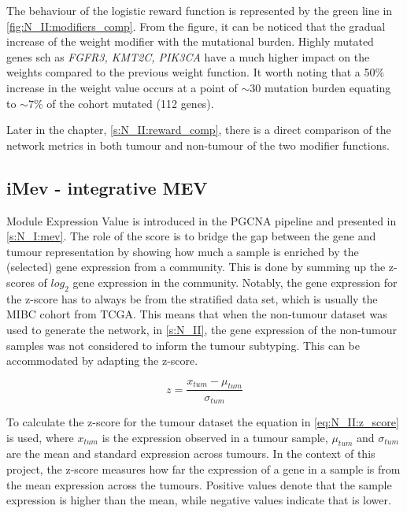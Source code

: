 The behaviour of the logistic reward function is represented by the green line in \cref{fig:N_II:modifiers_comp}. From the figure, it can be noticed that the gradual increase of the weight modifier with the mutational burden. Highly mutated genes sch as \textit{FGFR3, KMT2C, PIK3CA} have a much higher impact on the weights compared to the previous weight function. It worth noting that a 50\% increase in the weight value occurs at a point of $\sim$30 mutation burden equating to $\sim7$\% of the cohort mutated (112 genes).

Later in the chapter, \cref{s:N_II:reward_comp}, there is a direct comparison of the network metrics in both tumour and non-tumour of the two modifier functions.



\subsection*{iMev - integrative MEV} \label{s:N_II:iMEV}

Module Expression Value is introduced in the PGCNA pipeline \citep{Care2019-ij} and presented in \cref{s:N_I:mev}. The role of the score is to bridge the gap between the gene and tumour representation by showing how much a sample is enriched by the (selected) gene expression from a community. This is done by summing up the z-scores of $log_2$ gene expression in the community. Notably, the gene expression for the z-score has to always be from the stratified data set, which is usually the MIBC cohort from TCGA. This means that when the non-tumour dataset was used to generate the network, in \cref{s:N_II}, the gene expression of the non-tumour samples was not considered to inform the tumour subtyping. This can be accommodated by adapting the z-score.

\begin{equation} \label{eq:N_II:z_score}
z = \frac{x_{tum} - \mu_{tum}}{\sigma_{tum}}
\end{equation}

To calculate the z-score for the tumour dataset the equation in \cref{eq:N_II:z_score} is used, where $x_{tum}$ is the expression observed in a tumour sample, $\mu_{tum}$ and $\sigma_{tum}$ are the mean and standard expression across tumours. In the context of this project, the z-score measures how far the expression of a gene in a sample is from the mean expression across the tumours. Positive values denote that the sample expression is higher than the mean, while negative values indicate that is lower.



